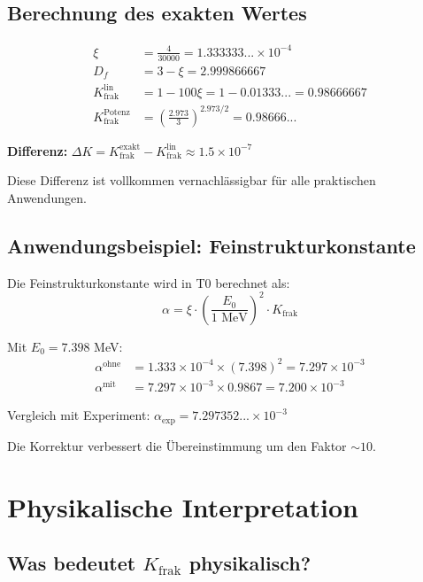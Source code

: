 	\subsection{Berechnung des exakten Wertes}
	
	\begin{align}
		\xi &= \frac{4}{30000} = 1.333333... \times 10^{-4} \\
		D_f &= 3 - \xi = 2.999866667 \\
		K_{\text{frak}}^{\text{lin}} &= 1 - 100\xi = 1 - 0.01333... = 0.98666667 \\
		K_{\text{frak}}^{\text{Potenz}} &= \left(\frac{2.973}{3}\right)^{2.973/2} = 0.98666...
	\end{align}
	
	\textbf{Differenz:} $\Delta K = K_{\text{frak}}^{\text{exakt}} - K_{\text{frak}}^{\text{lin}} \approx 1.5 \times 10^{-7}$
	
	Diese Differenz ist vollkommen vernachlässigbar für alle praktischen Anwendungen.
	
	\subsection{Anwendungsbeispiel: Feinstrukturkonstante}
	
	Die Feinstrukturkonstante wird in T0 berechnet als:
	\begin{equation}
		\alpha = \xi \cdot \left(\frac{E_0}{1 \text{ MeV}}\right)^2 \cdot K_{\text{frak}}
	\end{equation}
	
	Mit $E_0 = 7.398$ MeV:
	\begin{align}
		\alpha^{\text{ohne}} &= 1.333 \times 10^{-4} \times (7.398)^2 = 7.297 \times 10^{-3} \\
		\alpha^{\text{mit}} &= 7.297 \times 10^{-3} \times 0.9867 = 7.200 \times 10^{-3}
	\end{align}
	
	Vergleich mit Experiment: $\alpha_{\text{exp}} = 7.297352... \times 10^{-3}$
	
	Die Korrektur verbessert die Übereinstimmung um den Faktor $\sim 10$.
	
	\section{Physikalische Interpretation}
	
	\subsection{Was bedeutet $K_{\text{frak}}$ physikalisch?}
	
